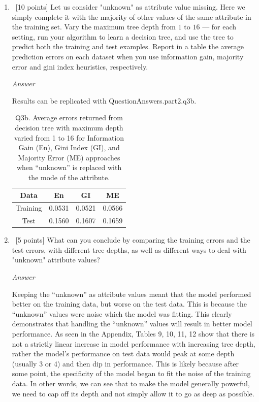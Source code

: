 \documentclass[12pt, fullpage,letterpaper]{article}
\begin{document}
\begin{enumerate}
\begin{enumerate}
	\item~[10 points] Let us consider "unknown" as  attribute value missing. Here we simply complete it with the majority of other values of the same attribute in the training set.   Vary the maximum  tree depth from $1$ to $16$ --- for each setting, run your algorithm to learn a decision tree, and use the tree to  predict both the training  and test examples. Report in a table the average prediction errors on each dataset when you use information gain, majority error and gini index heuristics, respectively.
	
	\emph{Answer}
	
	Results can be replicated with QuestionAnswers.part2.q3b.
	
	\begin{table}[h]
    	\centering
    	\begin{tabular}{c|ccc}
    		Data & En & GI & ME \\ 
    		\hline\hline
    		Training &  0.0531 & 0.0521 & 0.0566 \\ \hline
    		Test &  0.1560 & 0.1607 & 0.1659 \\ \hline
    	\end{tabular}
    	\caption{Q3b. Average errors returned from decision tree with maximum depth varied from 1 to 16 for Information Gain (En), Gini Index (GI), and Majority Error (ME) approaches when ``unknown'' is replaced with the mode of the attribute.}
    \end{table}
	
	\item~[5 points] What can you conclude by comparing the training errors and the test errors, with different tree depths, as well as different ways to deal with "unknown" attribute values?
	
	\emph{Answer}
	
	Keeping the ``unknown'' as attribute values meant that the model performed better on the training data, but worse on the test data. This is because the ``unknown'' values were noise which the model was fitting. This clearly demonstrates that handling the ``unknown'' values will result in better model performance. As seen in the Appendix, Tables 9, 10, 11, 12 show that there is not a strictly linear increase in model performance with increasing tree depth, rather the model's performance on test data would peak at some depth (usually 3 or 4) and then dip in performance. This is likely because after some point, the specificity of the model began to fit the noise of the training data. In other words, we can see that to make the model generally powerful, we need to cap off its depth and not simply allow it to go as deep as possible.
	
\end{enumerate}
\end{enumerate}
\end{document}
